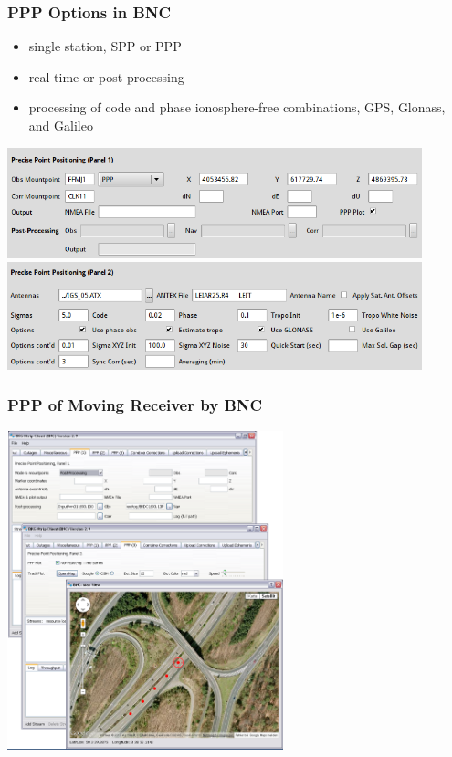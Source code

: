 \documentclass[10pt]{beamer}
\begin{document}

\begin{frame}
  \frametitle{PPP Options in BNC}
  \begin{itemize}
  \item single station, SPP or PPP
  \item real-time or post-processing
  \item processing of code and phase ionosphere-free combinations, GPS,
    Glonass, and Galileo
  \end{itemize}
  \begin{center}
    \includegraphics[width=0.9\textwidth,angle=0]{ppp_opt1.png} \\[2mm]
    \includegraphics[width=0.9\textwidth,angle=0]{ppp_opt2.png}
  \end{center}
\end {frame}


\begin{frame}
\frametitle{PPP of Moving Receiver by BNC}
  \begin{center}
    \includegraphics[width=0.6\textwidth,angle=0]{screenshot32.png}
  \end{center}
\end{frame}
\end{document}
